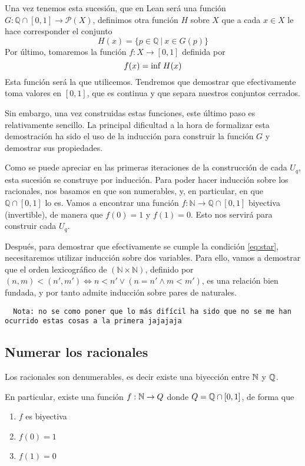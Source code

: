 Una vez tenemos esta sucesión, que en Lean será una función $G : \mathbb{Q}\cap[0, 1] \to \mathcal{P}(X)$, definimos otra función $H$ sobre $X$ que a cada $x \in X$ le hace corresponder el conjunto
$$
H(x) = \{p \in \mathbb{Q} ~|~ x \in G(p)\}
$$
Por último, tomaremos la función $f : X \to [0, 1]$ definida por
$$
f(x) = \textnormal{inf}~H(x)
$$
Esta función será la que utilicemos. Tendremos que demostrar que efectivamente toma valores en $[0, 1]$, que es continua y que separa nuestros conjuntos cerrados.

Sin embargo, una vez construidas estas funciones, este último paso es relativamente sencillo. La principal dificultad a la hora de formalizar esta demostración ha sido el uso de la inducción para construir la función $G$ y demostrar sus propiedades.

Como se puede apreciar en las primeras iteraciones de la construcción de cada $U_q$, esta sucesión se construye por inducción. Para poder hacer inducción sobre los racionales, nos basamos en que son numerables, y, en particular, en que $\mathbb{Q}\cap[0, 1]$ lo es. Vamos a encontrar una función $f : \mathbb{N} \to \mathbb{Q} \cap [0, 1]$ biyectiva (invertible), de manera que $f(0) = 1$ y $f(1) = 0$. Esto nos servirá para construir cada $U_q$.

Después, para demostrar que efectivamente se cumple la condición \ref{eq:star}, necesitaremos utilizar inducción sobre dos variables. Para ello, vamos a demostrar que el orden lexicográfico de $(\mathbb{N} \times \mathbb{N})$, definido por $(n, m) < (n', m') \iff n<n' \lor (n=n' \land m<m')$, es una relación bien fundada, y por tanto admite inducción sobre pares de naturales.

\begin{lstlisting}
  Nota: no se como poner que lo más difícil ha sido que no se me han ocurrido estas cosas a la primera jajajaja
\end{lstlisting}

\subsection{Numerar los racionales}

Los racionales son denumerables, es decir existe una biyección entre $\mathbb{N}$ y $\mathbb{Q}$.

En particular, existe una función $f : \mathbb{N} \to Q$ donde $Q = \mathbb{Q} \cap [0, 1]$, de forma que

\begin{enumerate}
  \item $f$ es biyectiva
  \item $f(0) = 1$
  \item $f(1) = 0$
\end{enumerate}

